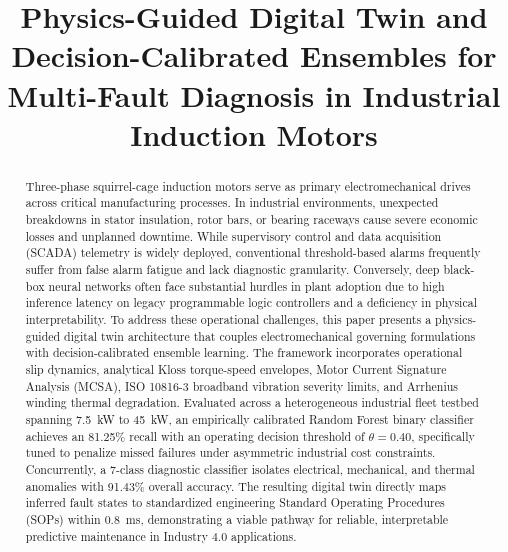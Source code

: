 \documentclass[conference]{IEEEtran}
\begin{document}
\title{Physics-Guided Digital Twin and Decision-Calibrated Ensembles for Multi-Fault Diagnosis in Industrial Induction Motors}

\author{
\and
{}
\and
{}
\and
{}
\and
{}
}

\maketitle

\begin{abstract}
Three-phase squirrel-cage induction motors serve as primary electromechanical drives across critical manufacturing processes. In industrial environments, unexpected breakdowns in stator insulation, rotor bars, or bearing raceways cause severe economic losses and unplanned downtime. While supervisory control and data acquisition (SCADA) telemetry is widely deployed, conventional threshold-based alarms frequently suffer from false alarm fatigue and lack diagnostic granularity. Conversely, deep black-box neural networks often face substantial hurdles in plant adoption due to high inference latency on legacy programmable logic controllers and a deficiency in physical interpretability. To address these operational challenges, this paper presents a physics-guided digital twin architecture that couples electromechanical governing formulations with decision-calibrated ensemble learning. The framework incorporates operational slip dynamics, analytical Kloss torque-speed envelopes, Motor Current Signature Analysis (MCSA), ISO 10816-3 broadband vibration severity limits, and Arrhenius winding thermal degradation. Evaluated across a heterogeneous industrial fleet testbed spanning 7.5~kW to 45~kW, an empirically calibrated Random Forest binary classifier achieves an 81.25\% recall with an operating decision threshold of $\theta = 0.40$, specifically tuned to penalize missed failures under asymmetric industrial cost constraints. Concurrently, a 7-class diagnostic classifier isolates electrical, mechanical, and thermal anomalies with 91.43\% overall accuracy. The resulting digital twin directly maps inferred fault states to standardized engineering Standard Operating Procedures (SOPs) within 0.8~ms, demonstrating a viable pathway for reliable, interpretable predictive maintenance in Industry 4.0 applications.
\end{abstract}
\end{document}
